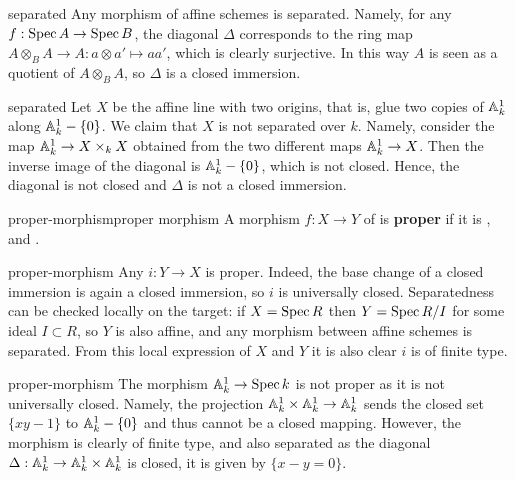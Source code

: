 \begin{example}{separated}
    Any morphism of affine schemes is separated. Namely, for any $f : \Spec A \to \Spec B$, the diagonal $\Delta$ corresponds to the ring map $A \otimes_B A \to A : a \otimes a' \mapsto aa'$, which is clearly surjective. In this way $A$ is seen as a quotient of $A \otimes_B A$, so $\Delta$ is a closed immersion.
\end{example}

\begin{example}{separated}
    Let $X$ be the affine line with two origins, that is, glue two copies of $\AA_k^1$ along $\AA_k^1 - \{ 0 \}$. We claim that $X$ is not separated over $k$. Namely, consider the map $\AA^1_k \to X \times_k X$ obtained from the two different maps $\AA_k^1 \to X$. Then the inverse image of the diagonal is $\AA_k^1 - \{ 0 \}$, which is not closed. Hence, the diagonal is not closed and $\Delta$ is not a closed immersion.
\end{example}

\begin{topic}{proper-morphism}{proper morphism}
    A morphism $f : X \to Y$ of  is \textbf{proper} if it is ,  and .
\end{topic}

\begin{example}{proper-morphism}
    Any  $i : Y \to X$ is proper. Indeed, the base change of a closed immersion is again a closed immersion, so $i$ is universally closed. Separatedness can be checked locally on the target: if $X = \Spec R$ then $Y = \Spec R / I$ for some ideal $I \subset R$, so $Y$ is also affine, and any morphism between affine schemes is separated. From this local expression of $X$ and $Y$ it is also clear $i$ is of finite type.
\end{example}

\begin{example}{proper-morphism}
    The morphism $\AA_k^1 \to \Spec k$ is not proper as it is not universally closed. Namely, the projection $\AA^1_k \times \AA^1_k \to \AA^1_k$ sends the closed set $\{ xy - 1 \}$ to $\AA^1_k - \{ 0 \}$ and thus cannot be a closed mapping. However, the morphism is clearly of finite type, and also separated as the diagonal $\Delta : \AA^1_k \to \AA^1_k \times \AA^1_k$ is closed, it is given by $\{ x - y = 0 \}$.
\end{example}

